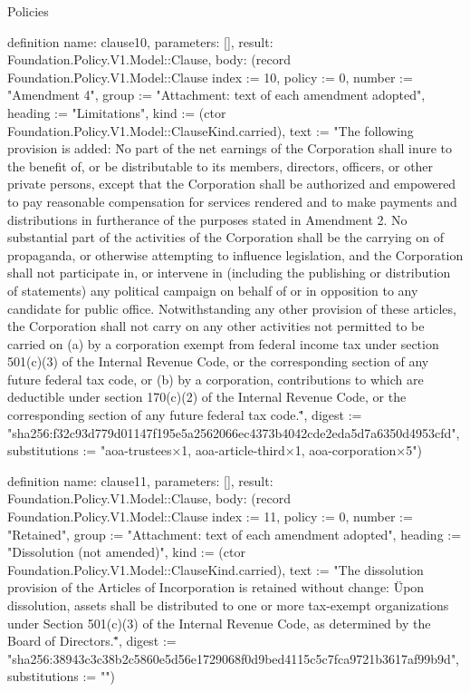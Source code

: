 \begin{lexlean}{Policies}
\begin{semanticmodule}
definition{
  name: clause10,
  parameters: [],
  result: Foundation.Policy.V1.Model::Clause,
  body: (record Foundation.Policy.V1.Model::Clause {index := 10, policy := 0, number := "Amendment 4", group := "Attachment: text of each amendment adopted", heading := "Limitations", kind := (ctor Foundation.Policy.V1.Model::ClauseKind.carried), text := "The following provision is added: \"No part of the net earnings of the Corporation shall inure to the benefit of, or be distributable to its members, directors, officers, or other private persons, except that the Corporation shall be authorized and empowered to pay reasonable compensation for services rendered and to make payments and distributions in furtherance of the purposes stated in Amendment 2. No substantial part of the activities of the Corporation shall be the carrying on of propaganda, or otherwise attempting to influence legislation, and the Corporation shall not participate in, or intervene in (including the publishing or distribution of statements) any political campaign on behalf of or in opposition to any candidate for public office. Notwithstanding any other provision of these articles, the Corporation shall not carry on any other activities not permitted to be carried on (a) by a corporation exempt from federal income tax under section 501(c)(3) of the Internal Revenue Code, or the corresponding section of any future federal tax code, or (b) by a corporation, contributions to which are deductible under section 170(c)(2) of the Internal Revenue Code, or the corresponding section of any future federal tax code.\"", digest := "sha256:f32c93d779d01147f195e5a2562066ec4373b4042cde2eda5d7a6350d4953cfd", substitutions := "aoa-trustees×1, aoa-article-third×1, aoa-corporation×5"})
}

definition{
  name: clause11,
  parameters: [],
  result: Foundation.Policy.V1.Model::Clause,
  body: (record Foundation.Policy.V1.Model::Clause {index := 11, policy := 0, number := "Retained", group := "Attachment: text of each amendment adopted", heading := "Dissolution (not amended)", kind := (ctor Foundation.Policy.V1.Model::ClauseKind.carried), text := "The dissolution provision of the Articles of Incorporation is retained without change: \"Upon dissolution, assets shall be distributed to one or more tax-exempt organizations under Section 501(c)(3) of the Internal Revenue Code, as determined by the Board of Directors.\"", digest := "sha256:38943c3c38b2c5860e5d56e1729068f0d9bed4115c5c7fca9721b3617af99b9d", substitutions := ""})
}


\end{semanticmodule}
\end{lexlean}
